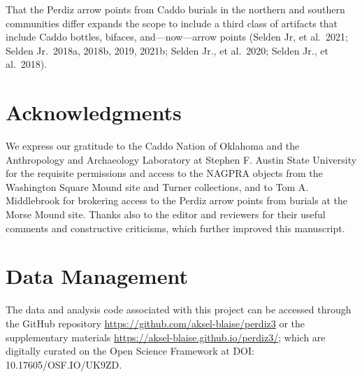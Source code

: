 \documentclass[smallextended]{svjour3}       %
\begin{document}
That the Perdiz arrow points from Caddo burials in the northern and
southern communities differ expands the scope to include a third class
of artifacts that include Caddo bottles, bifaces, and---now---arrow
points (Selden Jr, et al.~2021; Selden Jr.~2018a, 2018b, 2019, 2021b;
Selden Jr., et al.~2020; Selden Jr., et al.~2018).

\hypertarget{acknowledgments}{%
\section{Acknowledgments}\label{acknowledgments}}

We express our gratitude to the Caddo Nation of Oklahoma and the
Anthropology and Archaeology Laboratory at Stephen F. Austin State
University for the requisite permissions and access to the NAGPRA
objects from the Washington Square Mound site and Turner collections,
and to Tom A. Middlebrook for brokering access to the Perdiz arrow
points from burials at the Morse Mound site. Thanks also to the editor
and reviewers for their useful comments and constructive criticisms,
which further improved this manuscript.

\hypertarget{data-management}{%
\section{Data Management}\label{data-management}}

The data and analysis code associated with this project can be accessed
through the GitHub repository
\url{https://github.com/aksel-blaise/perdiz3} or the supplementary
materials \url{https://aksel-blaise.github.io/perdiz3/}; which are
digitally curated on the Open Science Framework at \newline DOI:
10.17605/OSF.IO/UK9ZD.




\end{document}
